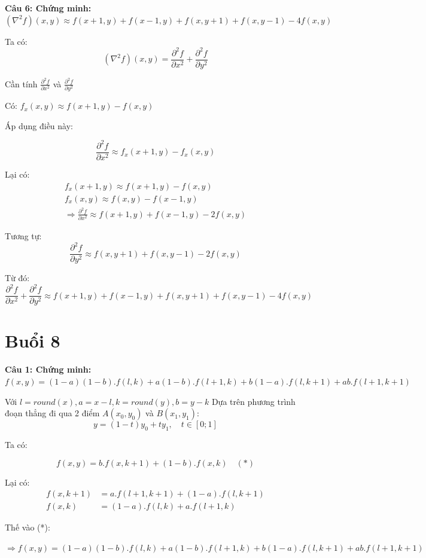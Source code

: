 \textbf{Câu 6: Chứng minh: $(\nabla ^2 f)(x, y) \approx f(x + 1, y) + f(x - 1, y) + f(x, y + 1) + f(x, y - 1) - 4f(x, y)$}

Ta có:
\[(\nabla ^ 2 f)(x, y) = \frac{\partial ^2 f}{\partial x^2} + \frac{\partial ^2 f}{\partial y^2}\]

Cần tính $\frac{\partial ^2 f}{\partial x^2}$ và $\frac{\partial ^2 f}{\partial y^2}$

Có: $f_x(x, y) \approx f(x + 1, y) - f(x, y)$

Áp dụng điều này:

\[\frac{\partial ^2 f}{\partial x^2} \approx f_x(x + 1, y) - f_x(x, y)\]

Lại có:
\begin{gather*}
	f_x(x + 1, y) \approx f(x+1, y) - f(x, y) \\
	f_x(x, y) \approx f(x, y) - f(x-1, y) \\
	\Rightarrow \frac{\partial ^2 f}{\partial x^2} \approx f(x+1, y) + f(x-1, y) - 2f(x, y)
\end{gather*}

Tương tự:
\[\frac{\partial ^2 f}{\partial y^2} \approx f(x, y+1) + f(x, y-1) - 2f(x, y)\]

Từ đó:
\[\frac{\partial ^2 f}{\partial x^2} + \frac{\partial ^2 f}{\partial y^2} \approx f(x + 1, y) + f(x - 1, y) + f(x, y + 1) + f(x, y - 1) - 4f(x, y)\]

\section{Buổi 8}

\textbf{Câu 1: Chứng minh: $f(x, y) = (1 - a)(1 - b).f(l, k) + a(1 - b).f(l + 1, k) + b(1 - a).f(l, k + 1) + ab.f(l + 1, k + 1)$}

Với $l = round(x), a = x - l, k = round(y), b = y - k$
Dựa trên phương trình đoạn thẳng đi qua 2 điểm $A(x_0, y_0)$ và $B(x_1, y_1)$:
\[y = (1 - t)y_0 + ty_1, \quad t \in [0; 1]\]

Ta có:

\[f(x, y) = b.f(x, k + 1) + (1 - b).f(x, k) \quad (*)\]

Lại có:
\begin{align*}
	f(x, k + 1) &= a.f(l + 1, k + 1) + (1 - a).f(l, k + 1) \\
	f(x, k) &= (1 - a).f(l, k) + a.f(l + 1, k)
\end{align*}

Thế vào (*):

$\Rightarrow f(x,y) = (1-a)(1-b).f(l,k) + a(1-b).f(l+1,k) + b(1-a).f(l,k+1) + ab.f(l+1,k+1)$

